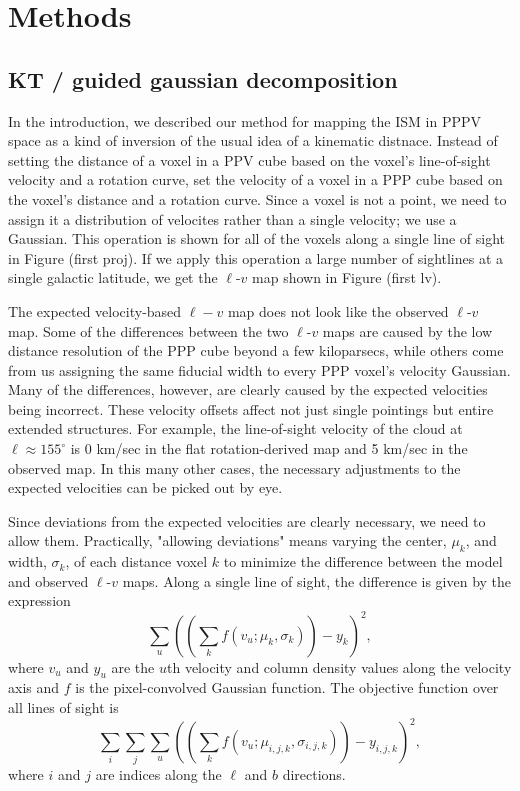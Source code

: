 \section{Methods}

\subsection{KT / guided gaussian decomposition}

In the introduction, we described our method for mapping the ISM in PPPV space as a kind of inversion of the usual idea of a kinematic distnace. Instead of setting the distance of a voxel in a PPV cube based on the voxel's line-of-sight velocity and a rotation curve, set the velocity of a voxel in a PPP cube based on the voxel's distance and a rotation curve. Since a voxel is not a point, we need to assign it a distribution of velocites rather than a single velocity; we use a Gaussian. This operation is shown for all of the voxels along a single line of sight in Figure (first proj). If we apply this operation a large number of sightlines at a single galactic latitude, we get the $\ell$-$v$ map shown in Figure (first lv). 

The expected velocity-based $\ell-v$ map does not look like the observed $\ell$-$v$ map. Some of the differences between the two $\ell$-$v$ maps are  caused by the low distance resolution of the PPP cube beyond a few kiloparsecs, while others come from us assigning the same fiducial width to every PPP voxel's velocity Gaussian. Many of the differences, however, are clearly caused by the expected velocities being incorrect. These velocity offsets affect not just single pointings but entire extended structures. For example, the line-of-sight velocity of the cloud at $\ell \approx 155^\circ$ is 0 km/sec in the flat rotation-derived map and 5 km/sec in the observed map. In this many other cases, the necessary adjustments to the expected velocities can be picked out by eye.

Since deviations from the expected velocities are clearly necessary, we need to allow them. Practically, "allowing deviations" means varying the center, $\mu_k$, and width, $\sigma_k$, of each distance voxel $k$ to minimize the difference between the model and observed $\ell$-$v$ maps. Along a single line of sight, the difference is given by the expression
\begin{equation}
    \sum_u ((\sum_k f(v_u; \mu_k, \sigma_k)) - y_k)^2,
\end{equation}
where $v_u$ and $y_u$ are the $u$th velocity and column density values along the velocity axis and $f$ is the pixel-convolved Gaussian function.
The objective function over all lines of sight is
\begin{equation}
\label{eq:objective-nosprings}
    \sum_i \sum_j \sum_u ((\sum_k f(v_u; \mu_{i,j,k}, \sigma_{i,j,k})) - y_{i,j,k})^2,
\end{equation}
where $i$ and $j$ are indices along the $\ell$ and $b$ directions. 

